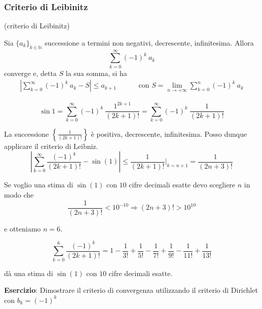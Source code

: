 \subsubsection{Criterio di Leibinitz}
\begin{theorem} (criterio di Leibinitz)
	\label{th:criterio di Leibinitz}
	
	Sia $\{a_k\}_{k\in \mathbb{N}}$ successione a termini non negativi, decrescente, infinitesima. Allora
	\begin{equation*}
		\sum_{k=0}^{\infty} (-1)^k \ a_k 
	\end{equation*}
	converge e, detta $S$ la sua somma, si ha
	\begin{align*}
		\left| \sum_{k=0}^{\infty} (-1)^k \ a_k - S \right| \leq a_{k+1} & \qquad \text{ con } S = \lim_{n \rightarrow +\infty} \sum_{k=0}^{n} (-1)^k \ a_k
	\end{align*}
\end{theorem}


\begin{exbar}
	\begin{example}
		\begin{equation*}
			\sin{1} = \sum_{k=0}^{\infty} (-1)^k \ \frac{1^{2k+1}} {(2k+1)!} = \sum_{k=0}^{\infty} (-1)^k \ \frac{1}{(2k+1)!}
		\end{equation*}
		
		La successione $\left\{ \frac{1}{(2k+1)!} \right\}$ è positiva, decrescente, infinitesima. Posso dunque applicare il criterio di Leibniz.
		\begin{equation*}
			\left| \sum_{k=0}^{\infty} \frac{(-1)^k} {(2k+1)!} - \sin(1) \right| \leq \frac{1}{(2k+1)!} \bigg|_{k=n+1}= \frac{1}{(2n+3)!}
		\end{equation*}
		
		Se voglio una stima di $\sin(1)$ con $10$ cifre decimali esatte devo scegliere $n$ in modo che 
		\begin{equation*}
			\frac{1}{(2n+3)!}<10^{-10} \Rightarrow (2n+3)! > 10^{10}
		\end{equation*}
		
		e otteniamo $n=6$.
		
		\begin{equation*}
			\sum_{k=0}^{6} \frac{(-1)^k}{(2k+1)!}= 1-\frac{1}{3!} +\frac{1}{5!}-\frac{1}{7!} +\frac{1}{9!}-\frac{1}{11!} +\frac{1}{13!}
		\end{equation*}
		
		dà una stima di $\sin(1)$ con $10$ cifre decimali esatte.
		
		\textbf{Esercizio}: Dimostrare il criterio di convergenza utilizzando il criterio di Dirichlet con $b_k=(-1)^k$
	\end{example}
\end{exbar}


